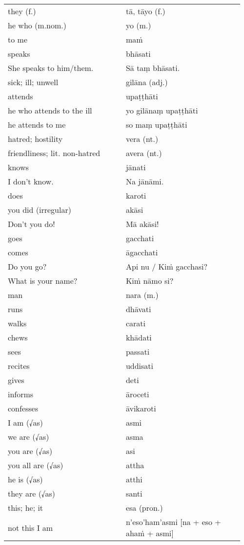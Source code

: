 \documentclass[a5paper]{memoir}
\begin{document}
\begin{longtable}{L{0.48\linewidth} L{0.48\linewidth}}
they (f.) & tā, tāyo (f.)\\[0pt]
he who (m.nom.) & yo (m.)\\[0pt]
to me & maṁ\\[0pt]
speaks & bhāsati\\[0pt]
She speaks to him/them. & Sā taṃ bhāsati.\\[0pt]
sick; ill; unwell & gilāna (adj.)\\[0pt]
attends & upaṭṭhāti\\[0pt]
he who attends to the ill & yo gilānaṃ upaṭṭhāti\\[0pt]
he attends to me & so maṃ upaṭṭhāti\\[0pt]
hatred; hostility & vera (nt.)\\[0pt]
friendliness; lit. non-hatred & avera (nt.)\\[0pt]
knows & jānati\\[0pt]
I don't know. & Na jānāmi.\\[0pt]
does & karoti\\[0pt]
you did (irregular) & akāsi\\[0pt]
Don't you do! & Mā akāsi!\\[0pt]
goes & gacchati\\[0pt]
comes & āgacchati\\[0pt]
Do you go? & Api nu / Kiṁ gacchasi?\\[0pt]
What is your name? & Kiṁ nāmo si?\\[0pt]
man & nara (m.)\\[0pt]
runs & dhāvati\\[0pt]
walks & carati\\[0pt]
chews & khādati\\[0pt]
sees & passati\\[0pt]
recites & uddisati\\[0pt]
gives & deti\\[0pt]
informs & āroceti\\[0pt]
confesses & āvikaroti\\[0pt]
I am (√as) & asmi\\[0pt]
we are (√as) & asma\\[0pt]
you are (√as) & asi\\[0pt]
you all are (√as) & attha\\[0pt]
he is (√as) & atthi\\[0pt]
they are (√as) & santi\\[0pt]
this; he; it & esa (pron.)\\[0pt]
not this I am & n'eso'ham'asmi [na + eso + ahaṁ + asmi]\\[0pt]

\end{longtable}
\end{document}
